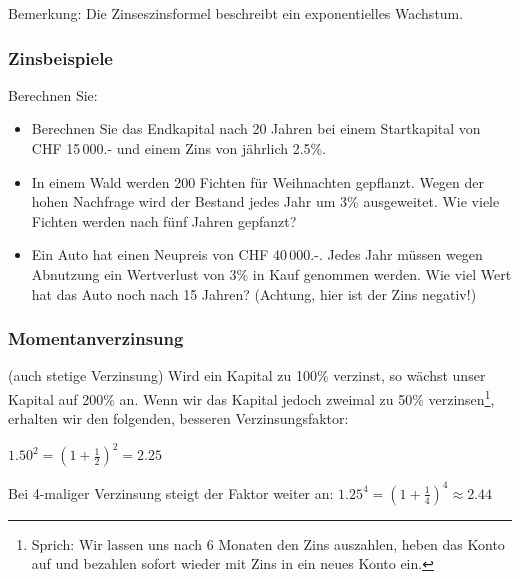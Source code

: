 Bemerkung: Die Zinseszinsformel beschreibt ein exponentielles Wachstum.
\newpage

\subsubsection{Zinsbeispiele}

Berechnen Sie:

\begin{itemize}
  \item Berechnen Sie das Endkapital nach 20 Jahren bei einem
  Startkapital von CHF 15\,000.- und einem Zins von jährlich
  2.5\%.\\%

\item In einem Wald werden 200 Fichten für Weihnachten
  gepflanzt. Wegen der hohen Nachfrage wird der Bestand jedes Jahr um
  3\% ausgeweitet.
  Wie viele Fichten werden nach fünf Jahren gepfanzt?


\item Ein Auto hat einen Neupreis von CHF 40\,000.-. Jedes Jahr müssen wegen Abnutzung ein Wertverlust von 3\% in Kauf
  genommen werden. Wie viel Wert hat das Auto noch nach 15 Jahren? (Achtung, hier ist der Zins negativ!)

\end{itemize}
\newpage

\subsubsection{Momentanverzinsung}
(auch stetige Verzinsung)
Wird ein Kapital zu 100\% verzinst, so wächst unser Kapital auf 200\%
an. Wenn wir das Kapital jedoch zweimal zu 50\%
verzinsen\footnote{Sprich: Wir lassen uns nach 6 Monaten den Zins
auszahlen, heben das Konto auf und bezahlen sofort wieder mit Zins in
ein neues Konto ein.}, erhalten wir den folgenden, besseren Verzinsungsfaktor:

$1.50^2  = (1 + \frac12)^2 = 2.25$

Bei 4-maliger Verzinsung steigt der Faktor weiter an:
$1.25^4 = (1 + \frac14)^4 \approx 2.44 $

